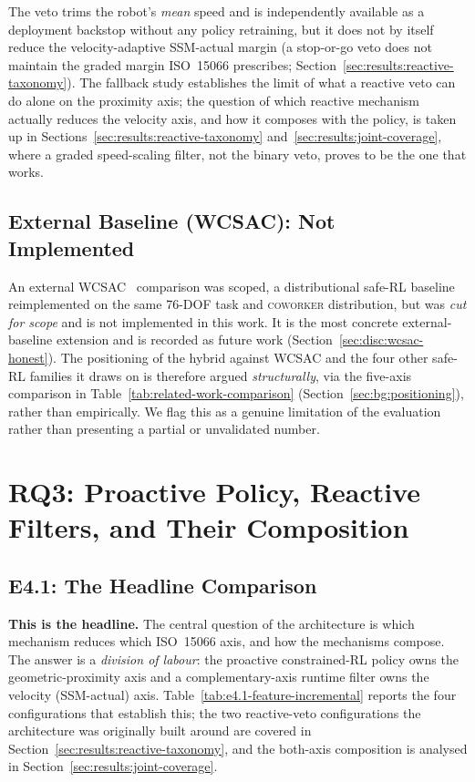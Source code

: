 \documentclass[11pt,a4paper]{report}
\newcommand{\ssm}{SSM}
\newcommand{\iso}{ISO~15066}
\newcommand{\coworker}{\textsc{coworker}}
\begin{document}
The veto trims the robot's \emph{mean} speed and is independently
available as a deployment backstop without any policy retraining, but
it does not by itself reduce the velocity-adaptive \ssm{}-actual margin
(a stop-or-go veto does not maintain the graded margin \iso{}
prescribes; Section~\ref{sec:results:reactive-taxonomy}). The fallback
study establishes the limit of what a reactive veto can do alone on
the proximity axis; the question of which reactive mechanism actually
reduces the velocity axis, and how it composes with the policy, is
taken up in Sections~\ref{sec:results:reactive-taxonomy}
and~\ref{sec:results:joint-coverage}, where a graded speed-scaling
filter, not the binary veto, proves to be the one that works.

\subsection{External Baseline (WCSAC): Not Implemented}
\label{sec:results:wcsac}

An external WCSAC~\cite{yang2021wcsac} comparison was scoped, a
distributional safe-RL baseline reimplemented on the same 76-DOF task
and \coworker{} distribution, but was \emph{cut for scope} and is not
implemented in this work. It is the most concrete external-baseline
extension and is recorded as future work
(Section~\ref{sec:disc:wcsac-honest}). The positioning of the hybrid
against WCSAC and the four other safe-RL families it draws on is
therefore argued \emph{structurally}, via the five-axis comparison in
Table~\ref{tab:related-work-comparison}
(Section~\ref{sec:bg:positioning}), rather than empirically. We flag
this as a genuine limitation of the evaluation rather than presenting a
partial or unvalidated number.

\section{RQ3: Proactive Policy, Reactive Filters, and Their Composition}
\label{sec:results:rq3}

\subsection{E4.1: The Headline Comparison}
\label{sec:results:headline-feature-table}

\textbf{This is the headline.} The central question of the
architecture is which mechanism reduces which \iso{} axis, and how the
mechanisms compose. The answer is a \emph{division of labour}: the
proactive constrained-RL policy owns the geometric-proximity axis and a
complementary-axis runtime filter owns the velocity (\ssm{}-actual)
axis. Table~\ref{tab:e4.1-feature-incremental} reports the four
configurations that establish this; the two reactive-veto
configurations the architecture was originally built around are
covered in Section~\ref{sec:results:reactive-taxonomy}, and the
both-axis composition is analysed in
Section~\ref{sec:results:joint-coverage}.
\end{document}
